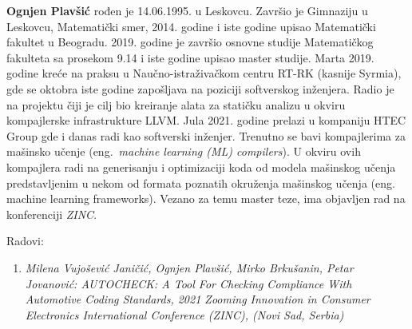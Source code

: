 \documentclass[12pt,oneside]{memoir}
\begin{document}
\begin{biografija}
  \textbf{Ognjen Plavšić} rođen je 14.06.1995. u Leskovcu. Zavr\v{s}io je Gimnaziju u Leskovcu, Matemati\v{c}ki smer, 2014. godine
  i iste godine upisao Matemati\v{c}ki fakultet u Beogradu. 2019. godine je zavr\v{s}io osnovne studije Matemati\v{c}kog fakulteta sa prosekom 9.14 i iste
  godine upisao master studije. Marta 2019. godine kre\'{c}e na praksu u Nau\v{c}no-istra\v{z}iva\v{c}kom centru RT-RK (kasnije Syrmia), gde
  se oktobra iste godine zapo\v{s}ljava na poziciji softverskog in\v{z}enjera. Radio je na projektu \v{c}iji je cilj bio kreiranje alata za stati\v{c}ku analizu u okviru kompajlerske infrastrukture
  LLVM. Jula 2021. godine prelazi u kompaniju HTEC Group gde i danas
  radi kao softverski in\v{z}enjer. Trenutno se bavi kompajlerima za ma\v{s}insko u\v{c}enje
  (eng.~\textit{machine learning (ML) compilers}). U okviru ovih kompajlera radi na generisanju i optimizaciji koda od modela ma\v{s}inskog u\v{c}enja predstavljenim u nekom od formata poznatih okru\v{z}enja ma\v{s}inskog u\v{c}enja (eng. machine learning frameworks). Vezano za temu master teze, ima objavljen rad na konferenciji \textit{ZINC}. \par
  Radovi:
  \begin{enumerate}
    \item{\textit{Milena Vujo\v{s}evi\'{c} Jani\v{c}i\'{c}, Ognjen Plav\v{s}i\'{c}, Mirko Brku\v{s}anin, Petar Jovanovi\'{c}: AUTOCHECK: A Tool For Checking Compliance With Automotive Coding Standards, 2021 Zooming Innovation in Consumer Electronics International Conference (ZINC), (Novi Sad, Serbia)}
    }
    
  \end{enumerate}

\end{biografija}
\end{document}
